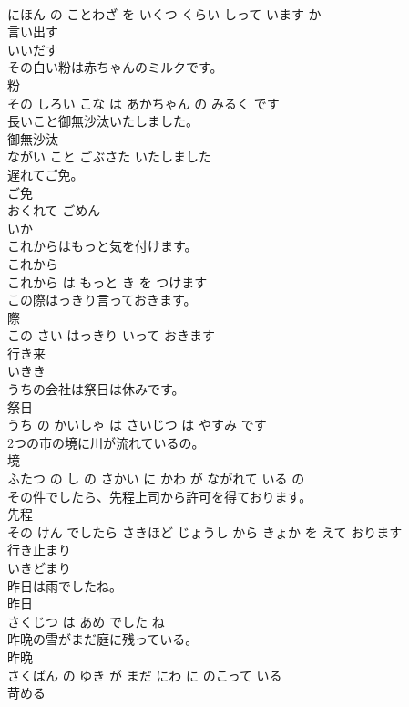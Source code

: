 \documentclass[8pt]{extreport}
\begin{document}
\begin{CJK}{UTF8}{min}
\\	にほん の ことわざ を いくつ くらい しって います か			
\\	言い出す	
\\	いいだす			
\\	その白い粉は赤ちゃんのミルクです。	
\\	粉 
\\	その しろい こな は あかちゃん の みるく です			
\\	長いこと御無沙汰いたしました。	
\\	御無沙汰 
\\	ながい こと ごぶさた いたしました			
\\	遅れてご免。	
\\	ご免 
\\	おくれて ごめん			
\\	いか	
\\	これからはもっと気を付けます。	
\\	これから 
\\	これから は もっと き を つけます			
\\	この際はっきり言っておきます。	
\\	際 
\\	この さい はっきり いって おきます			
\\	行き来	
\\	いきき			
\\	うちの会社は祭日は休みです。	
\\	祭日 
\\	うち の かいしゃ は さいじつ は やすみ です			
\\	2つの市の境に川が流れているの。	
\\	境 
\\	ふたつ の し の さかい に かわ が ながれて いる の			
\\	その件でしたら、先程上司から許可を得ております。	
\\	先程 
\\	その けん でしたら さきほど じょうし から きょか を えて おります			
\\	行き止まり	
\\	いきどまり			
\\	昨日は雨でしたね。	
\\	昨日 
\\	さくじつ は あめ でした ね			
\\	昨晩の雪がまだ庭に残っている。	
\\	昨晩 
\\	さくばん の ゆき が まだ にわ に のこって いる			
\\	苛める	

\end{CJK}
\end{document}
